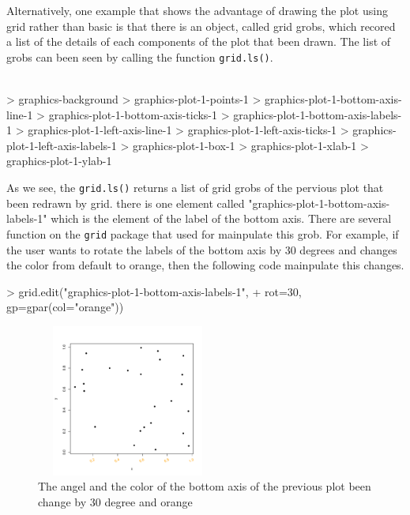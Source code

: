 \documentclass[a4paper,10pt]{article}
\begin{document}
Alternatively, one example that shows the advantage of drawing the plot using grid rather than basic is that there is an object, called grid grobs, which recored a list of the details of each components of the plot that been drawn. The list of grobs can been seen by calling the function \texttt{grid.ls()}. \\\\

\begin{Schunk}
\begin{Sinput}
> graphics-background
> graphics-plot-1-points-1
> graphics-plot-1-bottom-axis-line-1
> graphics-plot-1-bottom-axis-ticks-1
> graphics-plot-1-bottom-axis-labels-1
> graphics-plot-1-left-axis-line-1
> graphics-plot-1-left-axis-ticks-1
> graphics-plot-1-left-axis-labels-1
> graphics-plot-1-box-1
> graphics-plot-1-xlab-1
> graphics-plot-1-ylab-1
\end{Sinput}
\end{Schunk}

As we see, the \texttt{grid.ls()} returns a list of grid grobs of the pervious plot that been redrawn by grid. there is one element called "graphics-plot-1-bottom-axis-labels-1" which is the element of the label of the bottom axis. There are several function on the \texttt{grid} package that used for mainpulate this grob. For example, if the user wants to rotate the labels of the bottom axis by 30 degrees and changes the color from default to orange, then the following code mainpulate this changes.

\begin{Schunk}
\begin{Sinput}
> grid.edit("graphics-plot-1-bottom-axis-labels-1", 
+           rot=30, gp=gpar(col="orange"))
\end{Sinput}
\end{Schunk}

\begin{figure}[H]
\begin{center}
  \includegraphics[height = 5cm, width = 6cm]{figure/gridedit.pdf}
  \caption{The angel and the color of the bottom axis of the previous plot been change by 30 degree and orange}
  	\label{figure3}
\end{center}
\end{figure}
\end{document}
